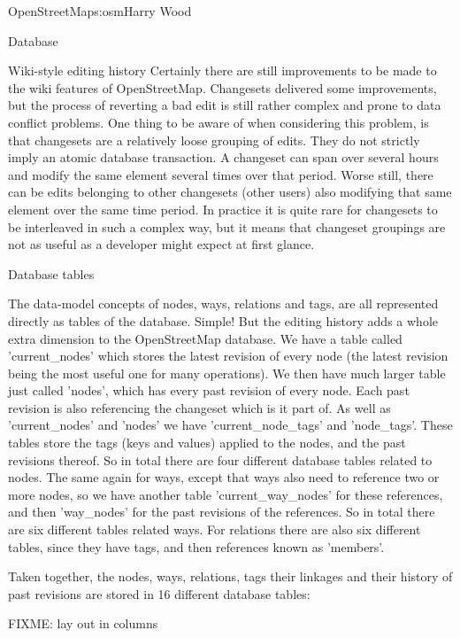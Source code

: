 \begin{aosachapter}{OpenStreetMap}{s:osm}{Harry Wood}
\begin{aosasect1}{Database}
\begin{aosasect2}{Wiki-style editing history}
Certainly there are still improvements to be made to the wiki features
of OpenStreetMap. Changesets delivered some improvements, but the
process of reverting a bad edit is still rather complex and prone to
data conflict problems. One thing to be aware of when considering this
problem, is that changesets are a relatively loose grouping of
edits. They do not strictly imply an atomic database transaction. A
changeset can span over several hours and modify the same element
several times over that period. Worse still, there can be edits
belonging to other changesets (other users) also modifying that same
element over the same time period. In practice it is quite rare for
changesets to be interleaved in such a complex way, but it means that
changeset groupings are not as useful as a developer might expect at
first glance.

\end{aosasect2}

\begin{aosasect2}{Database tables}

The data-model concepts of nodes, ways, relations and tags, are all
represented directly as tables of the database. Simple! But the
editing history adds a whole extra dimension to the OpenStreetMap
database. We have a table called 'current\_nodes' which stores the
latest revision of every node (the latest revision being the most
useful one for many operations). We then have much larger table just
called 'nodes', which has every past revision of every node. Each past
revision is also referencing the changeset which is it part of.  As
well as 'current\_nodes' and 'nodes' we have 'current\_node\_tags' and
'node\_tags'. These tables store the tags (keys and values) applied to
the nodes, and the past revisions thereof. So in total there are four
different database tables related to nodes. The same again for ways,
except that ways also need to reference two or more nodes, so we have
another table 'current\_way\_nodes' for these references, and then
'way\_nodes' for the past revisions of the references. So in total
there are six different tables related ways. For relations there are
also six different tables, since they have tags, and then references
known as 'members'.

Taken together, the nodes, ways, relations, tags their linkages and
their history of past revisions are stored in 16 different database
tables:

FIXME: lay out in columns


\end{aosasect2}
\end{aosasect1}
\end{aosachapter}
